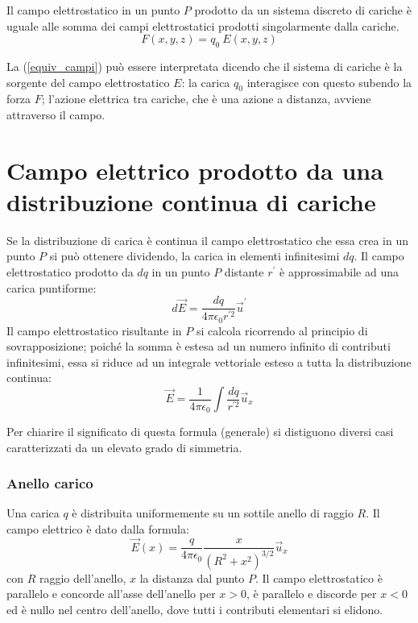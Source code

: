 \documentclass[class=book, crop=false, oneside, 12pt]{standalone}
\begin{document}
Il campo elettrostatico in un punto \(P\) prodotto da un sistema discreto di cariche è uguale alle somma dei campi elettrostatici prodotti singolarmente dalla cariche.
\begin{equation} \label{equiv_campi}
    F ( x, y, z) = q_0 \ E ( x, y, z) 
\end{equation}

La (\ref{equiv_campi}) può essere interpretata dicendo che il sistema di cariche è la sorgente del campo elettrostatico \(E\): la carica \(q_0\) interagisce con questo subendo la forza \(F\); 
l'azione elettrica tra cariche, che è una azione a distanza, avviene attraverso il campo. 

\section{Campo elettrico prodotto da una distribuzione continua di cariche}

Se la distribuzione di carica è continua il campo elettrostatico che essa crea in un punto \(P\) si può ottenere dividendo, la carica in elementi infinitesimi \(dq\).  
Il campo elettrostatico prodotto da \(dq\) in un punto \(P\) distante \(r^{\prime}\) è approssimabile ad una carica puntiforme: 
\begin{equation*}
    d \overrightarrow{E} = \frac{d q}{4 \pi \epsilon_0 r^{\prime 2}} \overrightarrow{u}^{\prime}
\end{equation*}
Il campo elettrostatico risultante in \(P\) si calcola ricorrendo al principio di sovrapposizione; poiché la somma è estesa ad un numero infinito di contributi infinitesimi, essa si riduce ad un integrale vettoriale esteso a tutta la distribuzione continua:
\begin{equation}
    \overrightarrow{E} = \frac{1}{4 \pi \epsilon_0} \int \frac{dq}{r^{\prime 2}} \overrightarrow{u}_x
\end{equation}

Per chiarire il significato di questa formula (generale) si distiguono diversi casi caratterizzati da un elevato grado di simmetria.

\subsubsection*{Anello carico}

Una carica \(q\) è distribuita uniformemente su un sottile anello di raggio \(R\).  
Il campo elettrico è dato dalla formula:
\begin{equation*}
    \overrightarrow{E} (x) = \frac{q}{4 \pi \epsilon_0} \frac{x}{\left(R^2 + x^2\right)^{3/2}} \overrightarrow{u}_x
\end{equation*}
con \(R\) raggio dell'anello, \(x\) la distanza dal punto \(P\).
Il campo elettrostatico è parallelo e concorde all'asse dell'anello per \(x > 0\), è parallelo e discorde per \(x < 0\) ed è nullo nel centro dell'anello, 
dove tutti i contributi elementari si elidono.
\end{document}
